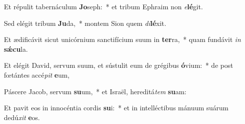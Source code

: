 \item Et répulit tabernáculum \textbf{Jo}seph:~* et tribum Ephraim non \textit{e}\textbf{lé}git.
\item Sed elégit tribum \textbf{Ju}da,~* montem Sion quem \textit{di}\textbf{lé}xit.
\item Et ædificávit sicut unicórnium sanctifícium suum in \textbf{ter}ra,~* quam fundávit \textit{in} \textbf{sǽ}\textbf{cu}la.
\item Et elégit David, servum suum, et sústulit eum de grégibus \textbf{ó}vium:~* de post fœtántes accé\textit{pit} \textbf{e}um,
\item Páscere Jacob, servum \textbf{su}um,~* et Israël, hereditá\textit{tem} \textbf{su}am:
\item Et pavit eos in innocéntia cordis \textbf{su}i:~* et in intelléctibus mánuum suárum dedú\textit{xit} \textbf{e}os.
